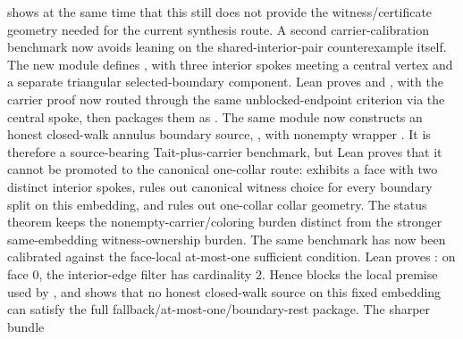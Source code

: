 \documentclass[11pt]{article}
\begin{document}
shows at the same time that this still does not provide the witness/certificate
geometry needed for the current synthesis route.
A second carrier-calibration benchmark now avoids leaning on the
shared-interior-pair counterexample itself.  The new module
 defines
, with three interior spokes meeting a
central vertex and a separate triangular selected-boundary component.  Lean
proves  and
,
with the carrier proof now routed through the same unblocked-endpoint
criterion via the central spoke,
then packages them as
.
The same module now constructs an honest closed-walk annulus boundary source,
, with nonempty
wrapper
.  It is
therefore a source-bearing Tait-plus-carrier benchmark, but Lean proves that
it cannot be promoted to the canonical one-collar route:
exhibits a face with two distinct interior spokes,
rules out canonical witness choice for every boundary split on this embedding,
and
rules out one-collar collar geometry.  The status theorem
keeps the nonempty-carrier/coloring burden distinct from the stronger
same-embedding witness-ownership burden.
The same benchmark has now been calibrated against the face-local
at-most-one sufficient condition.  Lean proves
: on face \(0\),
the interior-edge filter has cardinality \(2\).  Hence
 blocks the
local premise used by
,
and
shows that no honest closed-walk source on this fixed embedding can satisfy
the full fallback/at-most-one/boundary-rest package.  The sharper bundle
\end{document}

